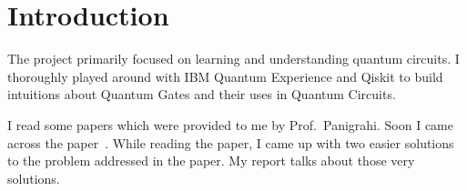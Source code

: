 \section{Introduction}

    The project primarily focused on learning and understanding quantum circuits. I thoroughly played around with IBM Quantum Experience and Qiskit to build intuitions about Quantum Gates and their uses in Quantum Circuits.

    I read some papers which were provided to me by Prof.\ Panigrahi. Soon I came across the paper~\cite{mahanti2019quantum}. While reading the paper, I came up with two easier solutions to the problem addressed in the paper. My report talks about those very solutions.